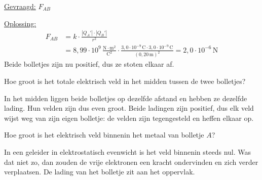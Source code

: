 \documentclass{ximera}
\begin{document}
\begin{exercise}
\begin{question}
\begin{solution}
            \underline{Gevraagd:} $F_{AB}$

            \underline{Oplossing:}
            \begin{align*}
                F_{AB} &= k \cdot \frac{|Q_A'| \cdot |Q_B'|}{r^2} \\
                &= 8{,}99 \cdot 10^{9} \, \mathrm{\frac{N \cdot m^2}{C^2}} \cdot \frac{3{,}0 \cdot 10^{-9} \, \mathrm{C} \cdot 3{,}0 \cdot 10^{-9} \, \mathrm{C}}{(0{,}20 \, \mathrm{m})^2} = \boxed{2{,}0 \cdot 10^{-6} \, \mathrm{N}}
            \end{align*}
            Beide bolletjes zijn nu positief, dus ze stoten elkaar af.
        \end{solution}
    \end{question}

    \begin{question}
        Hoe groot is het totale elektrisch veld in het midden tussen de twee bolletjes?

        \begin{multipleChoice}
        \end{multipleChoice}

        \begin{solution}\nl
            In het midden liggen beide bolletjes op dezelfde afstand en hebben ze dezelfde lading. Hun velden zijn dus even groot. Beide ladingen zijn positief, dus elk veld wijst weg van zijn eigen bolletje: de velden zijn tegengesteld en heffen elkaar op.
        \end{solution}
    \end{question}

    \begin{question}
        Hoe groot is het elektrisch veld binnenin het metaal van bolletje $A$?

        \begin{multipleChoice}
        \end{multipleChoice}

        \begin{solution}\nl
            In een geleider in elektrostatisch evenwicht is het veld binnenin steeds nul. Was dat niet zo, dan zouden de vrije elektronen een kracht ondervinden en zich verder verplaatsen. De lading van het bolletje zit aan het oppervlak.
        \end{solution}
    \end{question}
\end{exercise}
\end{document}

